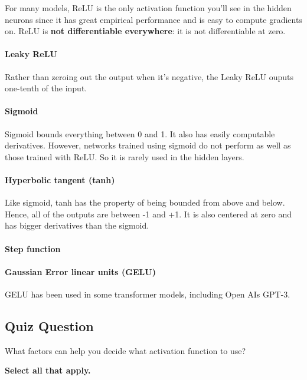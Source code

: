 For many models, ReLU is the only activation function you'll see in the hidden neurons since it has great empirical performance and is easy to compute gradients on. ReLU is \textbf{not differentiable everywhere}: it is not differentiable at zero. 

\paragraph{Leaky ReLU}
Rather than zeroing out the output when it's negative, the Leaky ReLU ouputs one-tenth of the input.

\paragraph{Sigmoid}
Sigmoid bounds everything between 0 and 1. It also has easily computable derivatives. However, networks trained using sigmoid do not perform as well as those trained with ReLU. So it is rarely used in the hidden layers.

\paragraph{Hyperbolic tangent (tanh)}
Like sigmoid, tanh has the property of being bounded from above and below. Hence, all of the outputs are between -1 and +1. It is also centered at zero and has bigger derivatives than the sigmoid. 

\paragraph{Step function}

\paragraph{Gaussian Error linear units (GELU)}
GELU has been used in some transformer models, including Open AIs GPT-3.


\subsection{Quiz Question}
What factors can help you decide what activation function to use?

\textbf{Select all that apply.}


